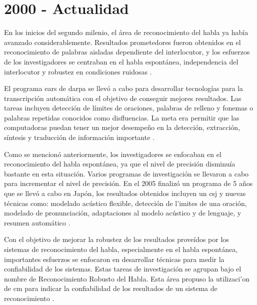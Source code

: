 \section{2000 - Actualidad}
\label{sec:post2000s}

En los inicios del segundo milenio, el \'{a}rea de reconocimiento del habla ya hab\'{i}a avanzado 
considerablemente. Resultados prometedores fueron obtenidos en el reconocimiento de palabras aisladas
dependiente del interlocutor, y los esfuerzos de los investigadores se centraban en el habla espont\'{a}nea,
independencia del interlocutor y robustez en condiciones ruidosas \cite{RonzhinSurvey2006}.

El programa \gls{ears} de \gls{darpa} se llev\'{o} a cabo para desarrollar tecnolog\'{i}as para la transcripci\'{o}n 
autom\'{a}tica con el objetivo de conseguir mejores resultados. 
Las tareas incluyen detecci\'{o}n de l\'{i}mites de oraciones, palabras de relleno 
y fonemas o palabras repetidas conocidos como disfluencias. 
La meta era permitir que las computadoras puedan tener un mejor desempe\~{n}o en la detecci\'{o}n, extracci\'{o}n, 
s\'{i}ntesis y traducci\'{o}n de informaci\'{o}n importante \cite{LiuStructural2005, SoltauTheIBM2005}.

Como se mencion\'{o} anteriormente, los investigadores se enfocaban en el reconocimiento del habla espont\'{a}nea, 
ya que el nivel de precisi\'{o}n disminu\'{i}a bastante en esta situaci\'{o}n. Varios programas de 
investigaci\'{o}n se llevaron a cabo para incrementar el nivel de precisi\'{o}n. En el 2005 finaliz\'{o} un 
programa de 5 a\~{n}os que se llev\'{o} a cabo en Jap\'{o}n, los resultados obtenidos incluyen un \gls{csj} 
y nuevas t\'{e}cnicas como: modelado ac\'{u}stico flexible, detecci\'{o}n de l'{i}mites de una oraci\'on,
modelado de pronunciaci\'{o}n, adaptaciones al modelo ac\'{u}stico y de lenguaje, 
y resumen autom\'{a}tico \cite{FuruiRecent2005}.

Con el objetivo de mejorar la robustez de los resultados prove\'{i}dos por los sistemas de reconocimiento del habla, 
especialmente en el habla espont\'{a}nea, importantes esfuerzos se enfocaron en desarrollar t\'{e}cnicas para medir 
la confiabilidad de los sistemas. Estas tareas de investigaci\'{o}n se agrupan bajo el nombre de 
Reconocimiento Robusto del Habla. Esta \'{a}rea propuso la utilizaci'{o}n de \gls{cm} para indicar 
la confiabilidad de los resultados de un sistema de reconocimiento \cite{JiangConfidence2005}.

